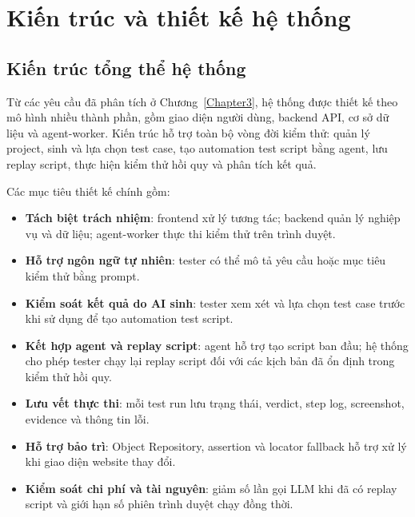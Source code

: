 
\chapter{Kiến trúc và thiết kế hệ thống}
\label{Chapter4}

\section{Kiến trúc tổng thể hệ thống}

Từ các yêu cầu đã phân tích ở Chương~\ref{Chapter3}, hệ thống được thiết kế theo mô hình nhiều thành phần, gồm giao diện người dùng, backend API, cơ sở dữ liệu và agent-worker. Kiến trúc hỗ trợ toàn bộ vòng đời kiểm thử: quản lý project, sinh và lựa chọn test case, tạo automation test script bằng agent, lưu replay script, thực hiện kiểm thử hồi quy và phân tích kết quả.

Các mục tiêu thiết kế chính gồm:

\begin{itemize}
    \item \textbf{Tách biệt trách nhiệm}: frontend xử lý tương tác; backend quản lý nghiệp vụ và dữ liệu; agent-worker thực thi kiểm thử trên trình duyệt.
    
    \item \textbf{Hỗ trợ ngôn ngữ tự nhiên}: tester có thể mô tả yêu cầu hoặc mục tiêu kiểm thử bằng prompt.
    
    \item \textbf{Kiểm soát kết quả do AI sinh}: tester xem xét và lựa chọn test case trước khi sử dụng để tạo automation test script.
    
    \item \textbf{Kết hợp agent và replay script}: agent hỗ trợ tạo script ban đầu; hệ thống cho phép tester chạy lại replay script đối với các kịch bản đã ổn định trong kiểm thử hồi quy.
    
    \item \textbf{Lưu vết thực thi}: mỗi test run lưu trạng thái, verdict, step log, screenshot, evidence và thông tin lỗi.
    
    \item \textbf{Hỗ trợ bảo trì}: Object Repository, assertion và locator fallback hỗ trợ xử lý khi giao diện website thay đổi.
    
    \item \textbf{Kiểm soát chi phí và tài nguyên}: giảm số lần gọi LLM khi đã có replay script và giới hạn số phiên trình duyệt chạy đồng thời.
\end{itemize}

